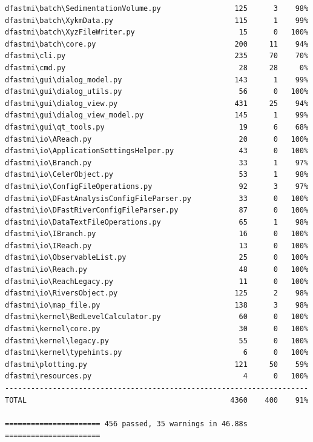 \begin{Verbatim}
dfastmi\batch\SedimentationVolume.py                 125      3    98%
dfastmi\batch\XykmData.py                            115      1    99%
dfastmi\batch\XyzFileWriter.py                        15      0   100%
dfastmi\batch\core.py                                200     11    94%
dfastmi\cli.py                                       235     70    70%
dfastmi\cmd.py                                        28     28     0%
dfastmi\gui\dialog_model.py                          143      1    99%
dfastmi\gui\dialog_utils.py                           56      0   100%
dfastmi\gui\dialog_view.py                           431     25    94%
dfastmi\gui\dialog_view_model.py                     145      1    99%
dfastmi\gui\qt_tools.py                               19      6    68%
dfastmi\io\AReach.py                                  20      0   100%
dfastmi\io\ApplicationSettingsHelper.py               43      0   100%
dfastmi\io\Branch.py                                  33      1    97%
dfastmi\io\CelerObject.py                             53      1    98%
dfastmi\io\ConfigFileOperations.py                    92      3    97%
dfastmi\io\DFastAnalysisConfigFileParser.py           33      0   100%
dfastmi\io\DFastRiverConfigFileParser.py              87      0   100%
dfastmi\io\DataTextFileOperations.py                  65      1    98%
dfastmi\io\IBranch.py                                 16      0   100%
dfastmi\io\IReach.py                                  13      0   100%
dfastmi\io\ObservableList.py                          25      0   100%
dfastmi\io\Reach.py                                   48      0   100%
dfastmi\io\ReachLegacy.py                             11      0   100%
dfastmi\io\RiversObject.py                           125      2    98%
dfastmi\io\map_file.py                               138      3    98%
dfastmi\kernel\BedLevelCalculator.py                  60      0   100%
dfastmi\kernel\core.py                                30      0   100%
dfastmi\kernel\legacy.py                              55      0   100%
dfastmi\kernel\typehints.py                            6      0   100%
dfastmi\plotting.py                                  121     50    59%
dfastmi\resources.py                                   4      0   100%
----------------------------------------------------------------------
TOTAL                                               4360    400    91%

====================== 456 passed, 35 warnings in 46.88s ======================
\end{Verbatim}

